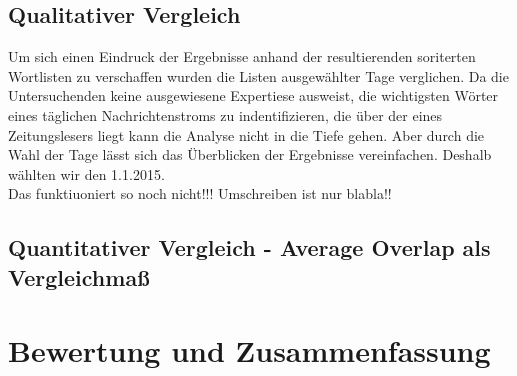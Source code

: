 \section{Qualitativer Vergleich}
Um sich einen Eindruck der Ergebnisse anhand der resultierenden soriterten Wortlisten zu verschaffen wurden die Listen ausgew\"ahlter Tage verglichen. Da die Untersuchenden keine ausgewiesene Expertiese ausweist, die wichtigsten W\"orter eines t\"aglichen Nachrichtenstroms zu indentifizieren, die \"uber der eines Zeitungslesers liegt kann die Analyse nicht in die Tiefe gehen. Aber durch die Wahl der Tage l\"asst sich das \"Uberblicken der Ergebnisse vereinfachen. Deshalb w\"ahlten wir den 1.1.2015. \\
 Das funktiuoniert so noch nicht!!! Umschreiben ist nur blabla!!
\section{Quantitativer Vergleich - Average Overlap als Vergleichma\ss}




\chapter{Bewertung und Zusammenfassung}



\nocite{*}%
 

